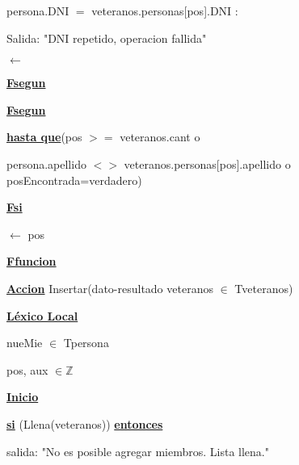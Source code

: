 \documentclass{article}
\begin{document}
                                \hspace{32mm} persona.DNI $=$ veteranos.personas[pos].DNI : 

                                    \hspace{36mm} Salida: "DNI repetido, operacion fallida"

                                    \hspace{36mm} $\leftarrow$ 

                            \hspace{28mm}\underline{\textbf{Fsegun}}

                    \hspace{20mm}\underline{\textbf{Fsegun}}

                \hspace{16mm}\underline{\textbf{hasta que}}(pos $>=$ veteranos.cant o
                    
                    \hspace{24mm}persona.apellido $<>$ veteranos.personas[pos].apellido o posEncontrada=verdadero)

            \hspace{12mm}\underline{\textbf{Fsi}}

            \hspace{12mm}$\leftarrow$ pos

    \hspace{4mm}\underline{\textbf{Ffuncion}}

    \vspace{4mm}

    \hspace{4mm}\underline{\textbf{Accion}} Insertar(dato-resultado veteranos $\in$ Tveteranos)

        \hspace{8mm}\underline{\textbf{Léxico Local}}

            \hspace{12mm}nueMie $\in$ Tpersona

            \hspace{12mm}pos, aux $\in \mathbb{Z}$

        \hspace{8mm}\underline{\textbf{Inicio}}

            \hspace{12mm}\underline{\textbf{si}} (Llena(veteranos)) \underline{\textbf{entonces}}

                \hspace{16mm}salida: "No es posible agregar miembros. Lista llena."
\end{document}
